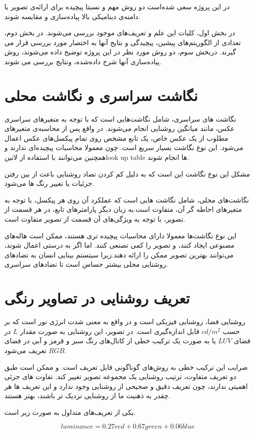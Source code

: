  در این پروژه سعی شده‌است دو  روش  مهم و نسبتا پیچیده برای ارائه‌ی تصویر با دامنه‌ی دینامیکی بالا پیاده‌سازی و مقایسه شوند.
 
 در بخش اول، کلیات این علم و تعریف‌های موجود بررسی می‌شوند. در بخش دوم، تعدادی از الگوریتم‌های پیشین، پیچیدگی و نتایج آنها به اختصار مورد بررسی قرار می گیرند. دربخش سوم، دو روش  مورد نظر در این پروژه توضیح داده می‌شوند، روش پیاده‌سازی آنها شرح داده‌شده، ونتایج بررسی می شوند.
 
 \section{  نگاشت سراسری و نگاشت محلی}
 
نگاشت های سراسری، شامل نگاشت‌هایی است که با توجه به متغیرهای سراسری عکس، مانند میانگین روشنایی انجام می‌شوند. در واقع پس از محاسبه‌ی متغیرهای مطلوب از یک عکس خاص، یک تابع مشخص روی تمام پیکسل‌های عکس اعمال می‌شود. این نوع نگاشت بسیار سریع است. چون معمولا محاسبات پیچیده‌ای ندارند و همچنین می‌توانند با استفاده از
 ‌لاتین{look up table  }
ها انجام شوند.

مشکل این نوع نگاشت این است که به دلیل کم کردن تضاد روشنایی باعث از بین رفتن جزئیات یا تغییر رنگ ها می‌شود.

نگاشت‌های محلی، شامل نگاشت هایی است که عملکرد آن روی هر پیکسل، با توجه به متغیرهای احاطه گر آن، متفاوت است.به زبان دیگر پارامترهای تابع، در هر قسمت از تصویر، با توجه به ویژگی‌های آن قسمت از تصویر متفاوت است.

این نوع نگاشت‌ها معمولا دارای محاسبات پیچیده تری هستند، ممکن است هاله‌های مصنوعی ایجاد کنند، و تصویر را کمی تصنعی کنند. اما اگر به درستی اعمال شوند، می‌توانند بهترین تصویر ممکن را ارائه دهند.زیرا سیتستم بینایی انسان به تضادهای روشنایی محلی بیشتر حساس است تا تضادهای سراسری.


\section{تعریف روشنایی در تصاویر رنگی}

روشنایی فضا، روشنایی فیزیکی است و در واقع به معنی شدت انرژی نور است که بر حسب $cd/m^{2}$ قابل اندازه‌گیری است. در تصویر، این روشنایی به صورت مقدار $L$ در فضای  $LUV$ یا به صورت یک ترکیب خطی از کانال‌های رنگ سبز و قرمز و آبی در فضای $RGB$ تعریف می‌شود.

ضرایب این ترکیب خطی به روش‌های گوناگونی قابل تعریف است.  و ممکن است طبق دو تعریف متفاوت، ترتیب روشنایی یک محموعه  تصویر تغییر کند. تفاوت های جزئی  اهمیتی ندارند، چون تعریف دقیق و صحیحی از روشنایی وجود ندارد و این تعریف ها هر چقدر به ذهنیت ما از روشنایی نزدیک تر باشند، بهتر  هستند.

یکی از تعریف‌های متداول به صورت زیر است.

\begin{equation}
luminance = 0.27 red + 0.67 green + 0.06 blue
\end{equation}